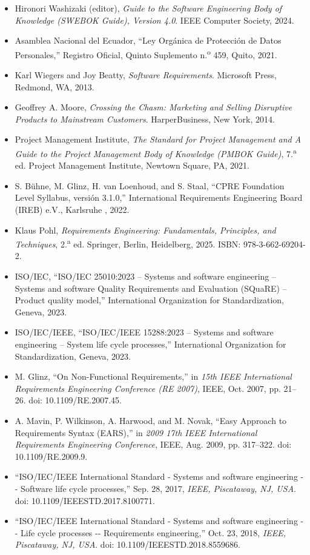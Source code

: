 {\small
\begin{itemize}
\setlength{\itemsep}{2pt}
\item[{[1]}] Hironori Washizaki (editor), \emph{Guide to the Software Engineering Body of Knowledge (SWEBOK Guide), Version 4.0}. IEEE Computer Society, 2024.
\item[{[2]}] Asamblea Nacional del Ecuador, ``Ley Orgánica de Protección de Datos Personales,'' Registro Oficial, Quinto Suplemento n.\textsuperscript{o} 459, Quito, 2021.
\item[{[3]}] Karl Wiegers and Joy Beatty, \emph{Software Requirements}. Microsoft Press, Redmond, WA, 2013.
\item[{[4]}] Geoffrey A. Moore, \emph{Crossing the Chasm: Marketing and Selling Disruptive Products to Mainstream Customers}. HarperBusiness, New York, 2014.
\item[{[5]}] Project Management Institute, \emph{The Standard for Project Management and A Guide to the Project Management Body of Knowledge (PMBOK Guide)}, 7.\textsuperscript{a} ed. Project Management Institute, Newtown Square, PA, 2021.
\item[{[6]}] S. Bühne, M. Glinz, H. van Loenhoud, and S. Staal, ``CPRE Foundation Level Syllabus, versión 3.1.0,'' International Requirements Engineering Board (IREB) e.V., Karlsruhe , 2022.
\item[{[7]}] Klaus Pohl, \emph{Requirements Engineering: Fundamentals, Principles, and Techniques}, 2.\textsuperscript{a} ed. Springer, Berlin, Heidelberg, 2025. ISBN: 978-3-662-69204-2.
\item[{[8]}] ISO/IEC, ``ISO/IEC 25010:2023 -- Systems and software engineering -- Systems and software Quality Requirements and Evaluation (SQuaRE) -- Product quality model,'' International Organization for Standardization, Geneva, 2023.
\item[{[9]}] ISO/IEC/IEEE, ``ISO/IEC/IEEE 15288:2023 -- Systems and software engineering -- System life cycle processes,'' International Organization for Standardization, Geneva, 2023.
\item[{[10]}] M. Glinz, ``On Non-Functional Requirements,'' in \emph{15th IEEE International Requirements Engineering Conference (RE 2007)}, IEEE, Oct. 2007, pp. 21--26. doi: 10.1109/RE.2007.45.
\item[{[11]}] A. Mavin, P. Wilkinson, A. Harwood, and M. Novak, ``Easy Approach to Requirements Syntax (EARS),'' in \emph{2009 17th IEEE International Requirements Engineering Conference}, IEEE, Aug. 2009, pp. 317--322. doi: 10.1109/RE.2009.9.
\item[{[12]}] ``ISO/IEC/IEEE International Standard - Systems and software engineering -\/- Software life cycle processes,'' Sep. 28, 2017, \emph{IEEE, Piscataway, NJ, USA}. doi: 10.1109/IEEESTD.2017.8100771.
\item[{[13]}] ``ISO/IEC/IEEE International Standard - Systems and software engineering -\/- Life cycle processes -\/- Requirements engineering,'' Oct. 23, 2018, \emph{IEEE, Piscataway, NJ, USA}. doi: 10.1109/IEEESTD.2018.8559686.
\end{itemize}
}
